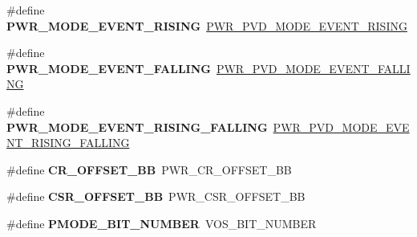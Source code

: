 \begin{DoxyCompactItemize}
\item 
\mbox{\label{group___h_a_l___p_w_r___aliased_gaca42d0e80c82d3f35ec7b07227fb8b7f}} 
\#define {\bfseries P\+W\+R\+\_\+\+M\+O\+D\+E\+\_\+\+E\+V\+E\+N\+T\+\_\+\+R\+I\+S\+I\+NG}~\hyperlink{group___p_w_r___p_v_d___mode_ga1a946b01887aa886de329a92c3ab0dd4}{P\+W\+R\+\_\+\+P\+V\+D\+\_\+\+M\+O\+D\+E\+\_\+\+E\+V\+E\+N\+T\+\_\+\+R\+I\+S\+I\+NG}
\item 
\mbox{\label{group___h_a_l___p_w_r___aliased_gaa37ffde31fc0bdadb0ed77a9588034dd}} 
\#define {\bfseries P\+W\+R\+\_\+\+M\+O\+D\+E\+\_\+\+E\+V\+E\+N\+T\+\_\+\+F\+A\+L\+L\+I\+NG}~\hyperlink{group___p_w_r___p_v_d___mode_gaaedbe45f1a1ea6c30af6ac51abae0cae}{P\+W\+R\+\_\+\+P\+V\+D\+\_\+\+M\+O\+D\+E\+\_\+\+E\+V\+E\+N\+T\+\_\+\+F\+A\+L\+L\+I\+NG}
\item 
\mbox{\label{group___h_a_l___p_w_r___aliased_ga87c794b332bd1b39496a35613344a4cc}} 
\#define {\bfseries P\+W\+R\+\_\+\+M\+O\+D\+E\+\_\+\+E\+V\+E\+N\+T\+\_\+\+R\+I\+S\+I\+N\+G\+\_\+\+F\+A\+L\+L\+I\+NG}~\hyperlink{group___p_w_r___p_v_d___mode_ga7455387c8e9049f9f66b46423d4f4091}{P\+W\+R\+\_\+\+P\+V\+D\+\_\+\+M\+O\+D\+E\+\_\+\+E\+V\+E\+N\+T\+\_\+\+R\+I\+S\+I\+N\+G\+\_\+\+F\+A\+L\+L\+I\+NG}
\item 
\mbox{\label{group___h_a_l___p_w_r___aliased_ga8f5087b1948b370918ecbdf8eb614543}} 
\#define {\bfseries C\+R\+\_\+\+O\+F\+F\+S\+E\+T\+\_\+\+BB}~P\+W\+R\+\_\+\+C\+R\+\_\+\+O\+F\+F\+S\+E\+T\+\_\+\+BB
\item 
\mbox{\label{group___h_a_l___p_w_r___aliased_gaed8fdacbc906bcba6acfa26ffbfc1305}} 
\#define {\bfseries C\+S\+R\+\_\+\+O\+F\+F\+S\+E\+T\+\_\+\+BB}~P\+W\+R\+\_\+\+C\+S\+R\+\_\+\+O\+F\+F\+S\+E\+T\+\_\+\+BB
\item 
\mbox{\label{group___h_a_l___p_w_r___aliased_gadcd5e2748a515ef914b84737e10ab061}} 
\#define {\bfseries P\+M\+O\+D\+E\+\_\+\+B\+I\+T\+\_\+\+N\+U\+M\+B\+ER}~V\+O\+S\+\_\+\+B\+I\+T\+\_\+\+N\+U\+M\+B\+ER
\item 
\mbox{\label{group___h_a_l___p_w_r___aliased_ga2e7c040f5c63f0fce3e274d9a03f1d1a}} 

\end{DoxyCompactItemize}
